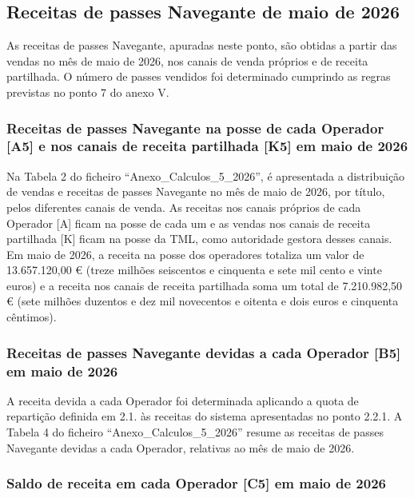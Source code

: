 \documentclass[
  a4paper,
]{article}
\begin{document}
\subsection{Receitas de passes Navegante de maio de
2026}\label{receitas-de-passes-navegante-de-maio-de-2026}

As receitas de passes Navegante, apuradas neste ponto, são obtidas a
partir das vendas no mês de maio de 2026, nos canais de venda próprios e
de receita partilhada. O número de passes vendidos foi determinado
cumprindo as regras previstas no ponto 7 do anexo V.

\subsubsection{Receitas de passes Navegante na posse de cada Operador
{[}A5{]} e nos canais de receita partilhada {[}K5{]} em maio de
2026}\label{receitas-de-passes-navegante-na-posse-de-cada-operador-a5-e-nos-canais-de-receita-partilhada-k5-em-maio-de-2026}

Na Tabela 2 do ficheiro ``Anexo\_Calculos\_5\_2026'', é apresentada a
distribuição de vendas e receitas de passes Navegante no mês de maio de
2026, por título, pelos diferentes canais de venda. As receitas nos
canais próprios de cada Operador {[}A{]} ficam na posse de cada um e as
vendas nos canais de receita partilhada {[}K{]} ficam na posse da TML,
como autoridade gestora desses canais. Em maio de 2026, a receita na
posse dos operadores totaliza um valor de 13.657.120,00 € (treze milhões
seiscentos e cinquenta e sete mil cento e vinte euros) e a receita nos
canais de receita partilhada soma um total de 7.210.982,50 € (sete
milhões duzentos e dez mil novecentos e oitenta e dois euros e cinquenta
cêntimos).

\subsubsection{Receitas de passes Navegante devidas a cada Operador
{[}B5{]} em maio de
2026}\label{receitas-de-passes-navegante-devidas-a-cada-operador-b5-em-maio-de-2026}

A receita devida a cada Operador foi determinada aplicando a quota de
repartição definida em 2.1. às receitas do sistema apresentadas no ponto
2.2.1. A Tabela 4 do ficheiro ``Anexo\_Calculos\_5\_2026'' resume as
receitas de passes Navegante devidas a cada Operador, relativas ao mês
de maio de 2026.

\subsubsection{Saldo de receita em cada Operador {[}C5{]} em maio de
2026}\label{saldo-de-receita-em-cada-operador-c5-em-maio-de-2026}
\end{document}
